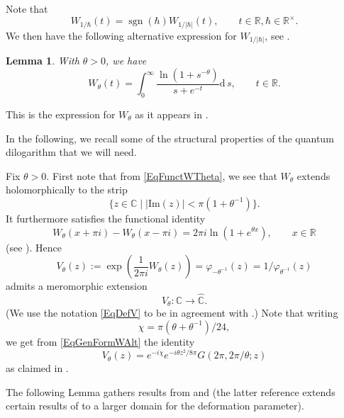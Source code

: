 \documentclass[11pt, reqno]{amsart}
\newtheorem{lemma}[theorem]{Lemma}
\theoremstyle{definition}
\numberwithin{equation}{section}
\def\C{\mathbb C}
\def\R{\mathbb R}
\def\sgn{\operatorname{sgn}}
\newcommand{\rd}{\mathrm{d}\!\,}
\newcommand{\Imm}{\mathrm{Im}}
\begin{document}
Note that 
\[
W_{1/\hbar}(t) = \sgn(\hbar) W_{1/|\hbar|}(t),\qquad t\in \R,\hbar\in \R^{\times}.
\]
We then have the following alternative expression for $W_{1/|\hbar|}$, see \cite[Proposition 2.4]{GK21}.

\begin{lemma}\label{LemOtherDescW}
With $\theta>0$, we have
\begin{equation}\label{EqDifferentExpW}
W_{\theta}(t) = \int_0^{\infty} \frac{\ln(1+s^{-\theta})}{s+e^{-t}}\rd s,\qquad t \in \R.
\end{equation}
\end{lemma}
This is the expression for $W_{\theta}$ as it appears in \cite{Wor00}. 

In the following, we recall some of the structural properties of the quantum dilogarithm that we will need.

Fix $\theta >0$. First note that from \eqref{EqFunctWTheta}, we see that $W_{\theta}$ extends holomorphically to the strip 
\[
\{z\in \C\mid |\Imm(z)|<\pi(1+\theta^{-1})\}.
\]
It furthermore satisfies the functional identity 
\[
W_{\theta}(x+\pi i ) - W_{\theta}(x-\pi i) = 2\pi i \ln(1+e^{\theta x}),\qquad x\in \R 
\]
(see \cite[Lemma 1.1]{Wor00}). Hence
\begin{equation}\label{EqDefV}
V_{\theta}(z) := \exp\left(\frac{1}{2\pi i}W_{\theta}(z)\right) =  \varphi_{-\theta^{-1}}(z)= 1/\varphi_{\theta^{-1}}(z)
\end{equation}
admits a meromorphic extension 
\[
V_{\theta}\colon  \C\rightarrow \hat{\C}.
\]
(We use the notation \eqref{EqDefV} to be in agreement with \cite{Wor00}.) Note that writing 
\begin{equation}\label{DefChi}
\chi= \pi(\theta+\theta^{-1})/24,
\end{equation}
we get from \eqref{EqGenFormWAlt} the identity 
\begin{equation}\label{EqIdentifSpecial}
V_{\theta}(z) = e^{-i\chi} e^{-i\theta z^2/8\pi}G(2\pi,2\pi/\theta;z)
\end{equation}
as claimed in \cite[Equation (A.18)]{Rui05}.



The following Lemma gathers results from \cite[Section 1 and Appendix A]{Wor00} and  \cite[Appendix A]{Rui05} (the latter reference extends certain results of \cite{Wor00} to a larger domain for the deformation parameter). 
\end{document}
